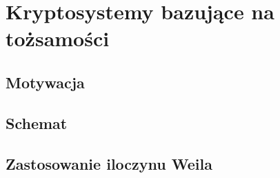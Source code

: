 \section{Kryptosystemy bazujące na tożsamości}

\subsection*{Motywacja}


\subsection*{Schemat}


\subsection*{Zastosowanie iloczynu Weila}


